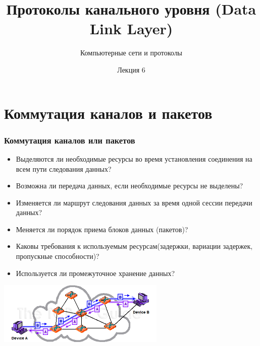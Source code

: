 \documentclass[utf8]{beamer}
\title{Протоколы канального уровня (Data Link Layer)}
\author {Компьютерные сети и протоколы}
\date{Лекция 6}
\begin{document}
\begin{frame}
\titlepage
\end{frame}
\section{Коммутация каналов и пакетов}
\begin{frame}
\frametitle{Коммутация каналов или пакетов}
\begin{itemize}
	\item Выделяются ли необходимые ресурсы во время установления соединения на всем пути следования данных?
	\item Возможна ли передача данных, если необходимые ресурсы не выделены?
	\item Изменяется ли маршрут следования данных за время одной сессии передачи данных?
	\item Меняется ли порядок приема блоков данных (пакетов)?
	\item Каковы требования к используемым ресурсам(задержки, вариации задержек, пропускные способности)?
	\item Используется ли промежуточное хранение данных?
\end{itemize}
\begin{center}
\includegraphics[width=0.6\textwidth]{pic/network.png}
\end{center}
\end{frame}
\end{document}
